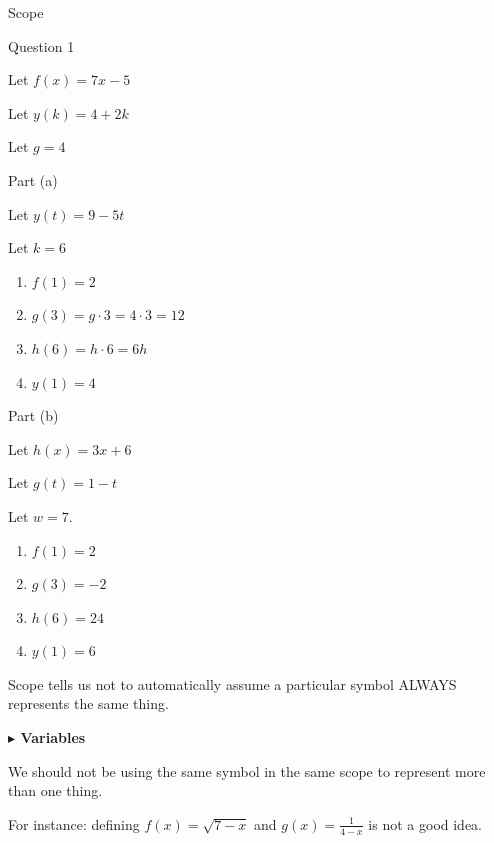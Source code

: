 \documentclass{ximera}
\begin{document}
\begin{example} Scope



\begin{model} Question 1

Let $f(x) = 7x - 5$  

Let $y(k) = 4 + 2k$

Let $g = 4$

	\begin{model} Part (a)

	Let $y(t) = 9 - 5t$

	Let $k = 6$
		\begin{enumerate}
			\item $f(1) = 2$
			\item $g(3) = g \cdot 3 = 4 \cdot 3 = 12$
			\item $h(6) = h \cdot 6 = 6h$
			\item $y(1) = 4$
		\end{enumerate}
	\end{model} 


	\begin{model} Part (b)

	Let $h(x) = 3x + 6$

	Let $g(t) = 1 - t$

	Let $w = 7$.

		\begin{enumerate}
			\item $f(1) = 2$
			\item $g(3) = -2$
			\item $h(6) = 24$
			\item $y(1) = 6$
		\end{enumerate}
	\end{model} 

\end{model}



\end{example}




Scope tells us not to automatically assume a particular symbol ALWAYS represents the same thing. 





\textbf{\textcolor{blue!55!black}{$\blacktriangleright$ Variables}}

We should not be using the same symbol in the same scope to represent more than one thing.

For instance: defining $f(x) = \sqrt{7-x}$ and $g(x) = \frac{1}{4-x}$ is not a good idea.
\end{document}

